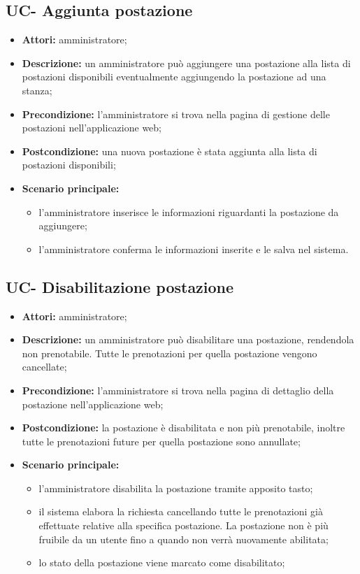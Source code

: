 
\subsection{UC- Aggiunta postazione}
\begin{itemize}
    \item \textbf{Attori:} amministratore;
    \item \textbf{Descrizione:} un amministratore pu\`{o} aggiungere una postazione alla lista di postazioni disponibili eventualmente aggiungendo la postazione ad una stanza;
    \item \textbf{Precondizione:} l'amministratore si trova nella pagina di gestione delle postazioni nell'applicazione web;
    \item \textbf{Postcondizione:} una nuova postazione \`{e} stata aggiunta alla lista di postazioni disponibili;
    \item \textbf{Scenario principale:}
    \begin{itemize}
        \item l'amministratore inserisce le informazioni riguardanti la postazione da aggiungere;
        \item l'amministratore conferma le informazioni inserite e le salva nel sistema.
    \end{itemize}
\end{itemize}


\subsection{UC- Disabilitazione postazione}
\begin{itemize}
    \item \textbf{Attori:} amministratore;
    \item \textbf{Descrizione:} un amministratore pu\`{o} disabilitare una postazione, rendendola non prenotabile. Tutte le prenotazioni per quella postazione vengono cancellate;
    \item \textbf{Precondizione:} l'amministratore si trova nella pagina di dettaglio della postazione nell'applicazione web;
    \item \textbf{Postcondizione:} la postazione \`{e} disabilitata e non pi\`{u} prenotabile, inoltre tutte le prenotazioni future per quella postazione sono annullate;
    \item \textbf{Scenario principale:}
    \begin{itemize}
        \item l'amministratore disabilita la postazione tramite apposito tasto;
        \item il sistema elabora la richiesta cancellando tutte le prenotazioni già effettuate relative alla specifica postazione. La postazione non è più fruibile da un utente fino a quando non verrà nuovamente abilitata;
        \item lo stato della postazione viene marcato come disabilitato;
    \end{itemize}
\end{itemize}


